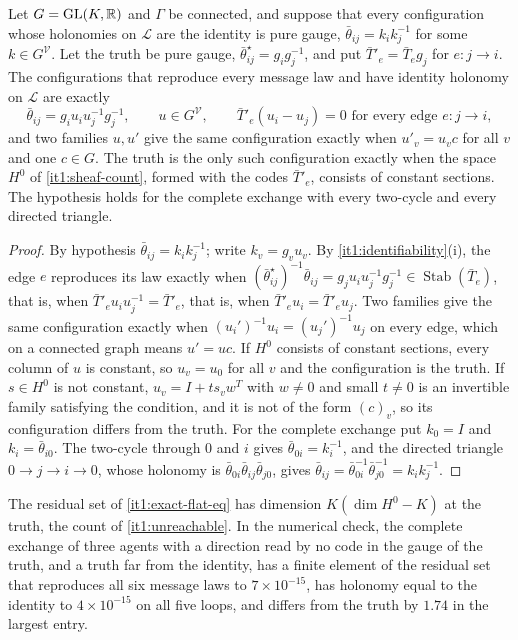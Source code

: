 \documentclass[11pt,letterpaper]{report}
\newcommand{\Stab}{\operatorname{Stab}}
\begin{document}
Let $G=\mathrm{GL}(K,\mathbb R)$ and $\Gamma$ be connected, and suppose that every configuration whose holonomies on $\mathcal L$ are the identity is pure gauge, $\bar\theta_{ij}=k_ik_j^{-1}$ for some $k\in G^{\mathcal V}$. Let the truth be pure gauge, $\bar\theta^\star_{ij}=g_ig_j^{-1}$, and put $\bar T'_e=\bar T_eg_j$ for $e:j\to i$. The configurations that reproduce every message law and have identity holonomy on $\mathcal L$ are exactly
\begin{equation}
\bar\theta_{ij}=g_iu_iu_j^{-1}g_j^{-1},\qquad u\in G^{\mathcal V},\qquad\bar T'_e(u_i-u_j)=0\text{ for every edge }e:j\to i,
\label{it1:exact-flat-eq}
\end{equation}
and two families $u,u'$ give the same configuration exactly when $u'_v=u_vc$ for all $v$ and one $c\in G$. The truth is the only such configuration exactly when the space $H^0$ of \cref{it1:sheaf-count}, formed with the codes $\bar T'_e$, consists of constant sections. The hypothesis holds for the complete exchange with every two-cycle and every directed triangle.
\begin{proof}
By hypothesis $\bar\theta_{ij}=k_ik_j^{-1}$; write $k_v=g_vu_v$. By \cref{it1:identifiability}(i), the edge $e$ reproduces its law exactly when $(\bar\theta^\star_{ij})^{-1}\bar\theta_{ij}=g_ju_iu_j^{-1}g_j^{-1}\in\Stab(\bar T_e)$, that is, when $\bar T'_eu_iu_j^{-1}=\bar T'_e$, that is, when $\bar T'_eu_i=\bar T'_eu_j$. Two families give the same configuration exactly when $(u_i')^{-1}u_i=(u_j')^{-1}u_j$ on every edge, which on a connected graph means $u'=uc$. If $H^0$ consists of constant sections, every column of $u$ is constant, so $u_v=u_0$ for all $v$ and the configuration is the truth. If $s\in H^0$ is not constant, $u_v=I+ts_vw^T$ with $w\neq0$ and small $t\neq0$ is an invertible family satisfying the condition, and it is not of the form $(c)_v$, so its configuration differs from the truth. For the complete exchange put $k_0=I$ and $k_i=\bar\theta_{i0}$. The two-cycle through $0$ and $i$ gives $\bar\theta_{0i}=k_i^{-1}$, and the directed triangle $0\to j\to i\to0$, whose holonomy is $\bar\theta_{0i}\bar\theta_{ij}\bar\theta_{j0}$, gives $\bar\theta_{ij}=\bar\theta_{0i}^{-1}\bar\theta_{j0}^{-1}=k_ik_j^{-1}$.
\end{proof}

The residual set of \cref{it1:exact-flat-eq} has dimension $K(\dim H^0-K)$ at the truth, the count of \cref{it1:unreachable}. In the numerical check, the complete exchange of three agents with a direction read by no code in the gauge of the truth, and a truth far from the identity, has a finite element of the residual set that reproduces all six message laws to $7\times10^{-15}$, has holonomy equal to the identity to $4\times10^{-15}$ on all five loops, and differs from the truth by $1.74$ in the largest entry.
\end{document}
